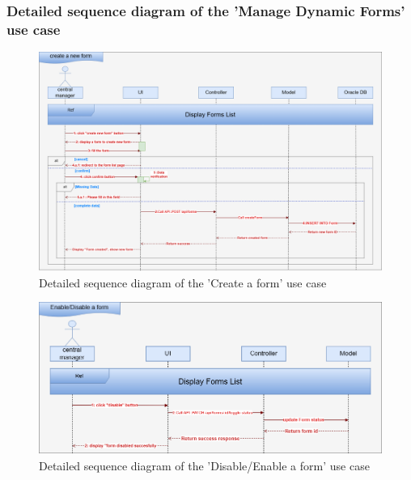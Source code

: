 \subsubsection{Detailed sequence diagram of the 'Manage Dynamic Forms' use case}
\begin{figure}[h!]
    \centering
    \includegraphics[width=1\textwidth]{figures/det manages dynamic form create a form.png}
    \caption{Detailed sequence diagram of the 'Create a form' use case}
\end{figure}
\begin{figure}[h!]
    \centering
    \includegraphics[width=1\textwidth]{figures/det enable a form.png}
    \caption{Detailed sequence diagram of the 'Disable/Enable a form' use case}
\end{figure}
\clearpage



